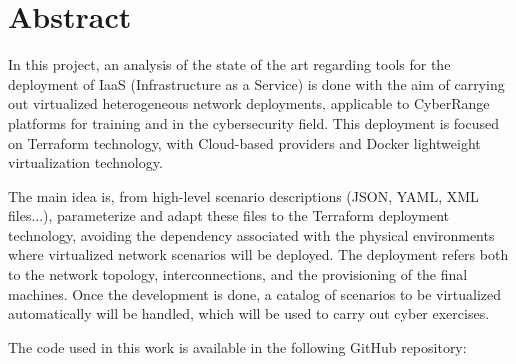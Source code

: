\newpage
\thispagestyle{plain}
\section*{Abstract}
  
  In this project, an analysis of the state of the art regarding tools for the deployment of IaaS (Infrastructure as a Service) is done with the aim of carrying out virtualized heterogeneous network deployments, applicable to CyberRange platforms for training and in the cybersecurity field. This deployment is focused on Terraform technology, with Cloud-based providers and Docker lightweight virtualization technology.

  The main idea is, from high-level scenario descriptions (JSON, YAML, XML files...), parameterize and adapt these files to the Terraform deployment technology, avoiding the dependency associated with the physical environments where virtualized network scenarios will be deployed. The deployment refers both to the network topology, interconnections, and the provisioning of the final machines. Once the development is done, a catalog of scenarios to be virtualized automatically will be handled, which will be used to carry out cyber exercises.

  The code used in this work is available in the following GitHub repository:

  \vspace{0.2cm}

  \begin{tcolorbox}[colback=orange!5!white,colframe=orange!75!black]
  \centering\href{https://github.com/samugs13/DAERV}{\textbf{\color{blue}{https://github.com/samugs13/DAERV}}}
  \end{tcolorbox}


\afterpage{\blankpage}

